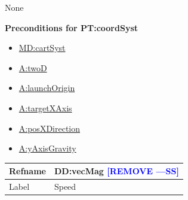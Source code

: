 \documentclass[12pt]{article}
\newcommand{\authornote}[3]{\textcolor{#1}{[#3 ---#2]}}
\newcommand{\authornote}[3]{}
\newcommand{\wss}[1]{\authornote{blue}{SS}{#1}}
\begin{document}
None

\noindent \textbf{Preconditions for PT:coordSyst}

\begin{itemize}
\item \hyperref[MD:cartSyst]{MD:cartSyst}
\item \hyperref[twoD]{A:twoD}
\item \hyperref[launchOrigin]{A:launchOrigin}
\item \hyperref[targetXAxis]{A:targetXAxis}
\item \hyperref[posXDirection]{A:posXDirection}
\item \hyperref[yAxisGravity]{A:yAxisGravity}
\end{itemize}

\medskip
\noindent
\begin{minipage}{\textwidth}
\begin{tabular}{>{\raggedright}p{}>{\raggedright\arraybackslash}p{}}
\toprule \textbf{Refname} & \textbf{DD:vecMag} \wss{REMOVE}
\label{DD:vecMag}
\\ \midrule
Label & Speed        
\\ \bottomrule
\end{tabular}
\end{minipage}
\end{document}
